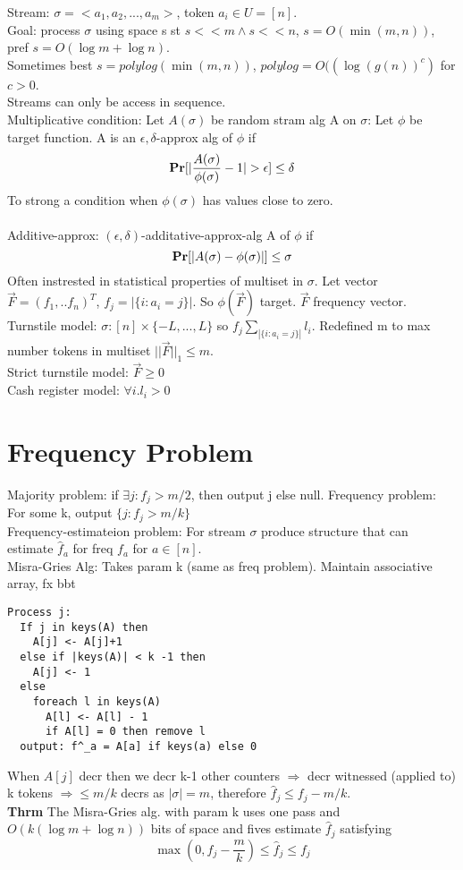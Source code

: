 \documentclass[a4paper]{article}
\def\Pr{\mbox{\textbf{Pr}}}
\begin{document}
Stream: \(\sigma = <a_1,a_2,...,a_m>\), token \(a_i \in U = [n]\).\\
Goal: process \(\sigma\) using space s st \(s<<m \wedge s << n\), \(s=O(\min(m,n))\), pref \(s=O(\log m + \log n)\).\\
Sometimes best \(s=polylog(\min(m,n))\), \(polylog = O((\log(g(n))^c)\) for \(c>0\).\\
Streams can only be access in sequence.\\
Multiplicative condition: Let \(A(\sigma)\) be random stram alg A on \(\sigma\): Let \(\phi\) be target function. A is an \(\epsilon,\delta\)-approx alg of \(\phi\) if
\[\Pr[|\frac{A(\sigma)}{\phi(\sigma)} -1 | > \epsilon] \leq \delta\]
To strong a condition when \(\phi(\sigma)\) has values close to zero.\\\\
Additive-approx:
\((\epsilon,\delta)\)-additative-approx-alg A of \(\phi\) if
\[\Pr[|A(\sigma) - \phi(\sigma)|] \leq \sigma\]
Often instrested in statistical properties of multiset in \(\sigma\). Let vector \(\vec{F} = (f_1,..f_n)^T\), \(f_j = |\{i:a_i = j\}|\). So \(\phi(\vec{F})\) target. \(\vec{F}\) frequency vector.\\
Turnstile model: \(\sigma: [n] \times \{-L,...,L\}\) so \(f_j \sum_{|\{i:a_i=j\}|} l_i\). Redefined m to max number tokens in multiset \(|\!|\vec{F}|\!|_1 \leq m\).\\
Strict turnstile model: \(\vec{F} \geq 0\)\\
Cash register model: \(\forall i.l_i > 0\)
\section{Frequency Problem}
Majority problem: if \(\exists j: f_j > m/2\), then output j else null.
Frequency problem: For some k, output \(\{j:f_j > m/k\}\)\\
Frequency-estimateion problem: For stream \(\sigma\) produce structure that can estimate \(\hat{f}_a\) for freq \(f_a\) for \(a \in [n]\).\\
Misra-Gries Alg: Takes param k (same as freq problem). Maintain associative array, fx bbt
\begin{verbatim}
Process j:
  If j in keys(A) then
    A[j] <- A[j]+1
  else if |keys(A)| < k -1 then
    A[j] <- 1
  else
    foreach l in keys(A)
      A[l] <- A[l] - 1
      if A[l] = 0 then remove l
  output: f^_a = A[a] if keys(a) else 0
\end{verbatim}
When \(A[j]\) decr then we decr k-1 other counters \(\Rightarrow\) decr witnessed (applied to) k tokens \(\Rightarrow \leq m/k\) decrs as \(|\sigma| = m\), therefore \(\hat{f}_j \leq f_j -  m/k\).\\
\textbf{Thrm} The Misra-Gries alg. with param k uses one pass and \(O(k(\log m+\log n))\) bits of space and fives estimate \(\hat{f}_j\) satisfying
\[\max(0,f_j - \frac{m}{k}) \leq \hat{f}_j \leq f_j\]
\end{document}
